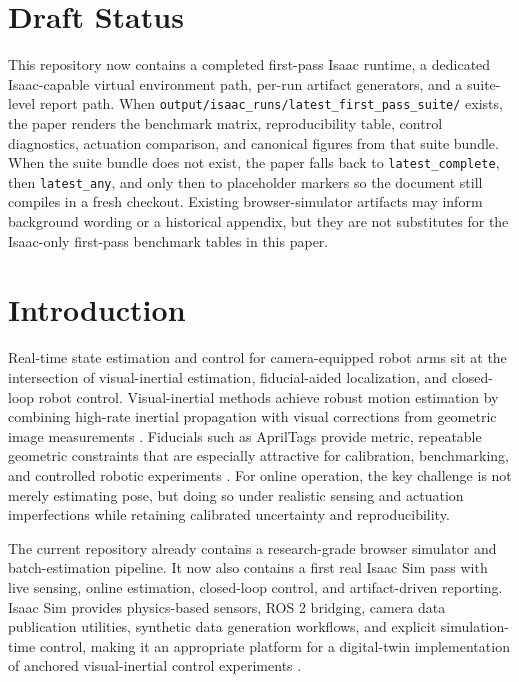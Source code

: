 \documentclass[11pt]{article}
\begin{document}
\section{Draft Status}
This repository now contains a completed first-pass Isaac runtime, a dedicated Isaac-capable virtual environment path, per-run artifact generators, and a suite-level report path. When \texttt{output/isaac\_runs/latest\_first\_pass\_suite/} exists, the paper renders the benchmark matrix, reproducibility table, control diagnostics, actuation comparison, and canonical figures from that suite bundle. When the suite bundle does not exist, the paper falls back to \texttt{latest\_complete}, then \texttt{latest\_any}, and only then to placeholder markers so the document still compiles in a fresh checkout. Existing browser-simulator artifacts may inform background wording or a historical appendix, but they are not substitutes for the Isaac-only first-pass benchmark tables in this paper.

\section{Introduction}
Real-time state estimation and control for camera-equipped robot arms sit at the intersection of visual-inertial estimation, fiducial-aided localization, and closed-loop robot control. Visual-inertial methods achieve robust motion estimation by combining high-rate inertial propagation with visual corrections from geometric image measurements \citep{mourikis2007msckf, forster2017preintegration, leutenegger2015okvis, qin2018vinsmono}. Fiducials such as AprilTags provide metric, repeatable geometric constraints that are especially attractive for calibration, benchmarking, and controlled robotic experiments \citep{olson2011apriltag, wang2016apriltag2}. For online operation, the key challenge is not merely estimating pose, but doing so under realistic sensing and actuation imperfections while retaining calibrated uncertainty and reproducibility.

The current repository already contains a research-grade browser simulator and batch-estimation pipeline. It now also contains a first real Isaac Sim pass with live sensing, online estimation, closed-loop control, and artifact-driven reporting. Isaac Sim provides physics-based sensors, ROS 2 bridging, camera data publication utilities, synthetic data generation workflows, and explicit simulation-time control, making it an appropriate platform for a digital-twin implementation of anchored visual-inertial control experiments \citep{nvidia_isaac_imu, nvidia_isaac_ros2_bridge, nvidia_isaac_ros2_camera, nvidia_isaac_replicator, nvidia_isaac_sim_manager}.
\end{document}
